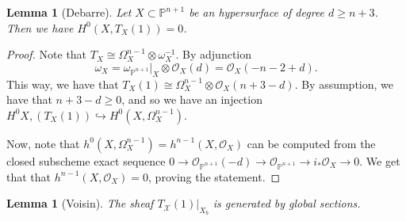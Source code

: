 \documentclass[leqno, openany]{memoir}
\newtheorem{lem}[thm]{Lemma}
\theoremstyle{definition}
\theoremstyle{remark}
\theoremstyle{plain}
\theoremstyle{definition}
\theoremstyle{remark}
\renewcommand{\P}{\mathbb{P}}
\newcommand{\mc}[1]{\mathcal{#1}}
\begin{document}
\begin{lem}[Debarre] \label{lemma:vanishingTX}
Let $X \subset \P^{n+1}$ be an hypersurface of degree $d\geq n+3$. Then we have $H^0(X, T_X(1))=0$.
\end{lem}

\begin{proof}
Note that $T_X \cong \Omega_X^{n-1} \otimes \omega_X^{-1}$. By adjunction
    \[ \omega_X = \omega_{\P^{n+1}}|_{X} \otimes \mc{O}_X(d)=\mc{O}_X(-n-2+d). \]
    This way, we have that $T_X(1) \cong \Omega_X^{n-1} \otimes \mc{O}_X(n+3-d)$. By assumption, we have that $n+3-d\geq 0$, and so we have an injection $H^0X, (T_X(1)) \hookrightarrow H^0(X, \Omega_X^{n-1})$. 

    Now, note that $h^0(X, \Omega_X^{n-1}) = h^{n-1}(X, \mc{O}_X)$ can be computed from the closed subscheme exact sequence $0 \to \mc{O}_{\P^{n+1}}(-d) \to \mc{O}_{\P^{n+1}} \to i_\ast \mc{O}_X \to 0$. We get that that $h^{n-1}(X, \mc{O}_X)=0$, proving the statement. 
\end{proof}

\begin{lem}[Voisin]
    The sheaf $T_{ \mc{X} }(1)|_{X_b}$ is generated by global sections.
\end{lem}
\end{document}
